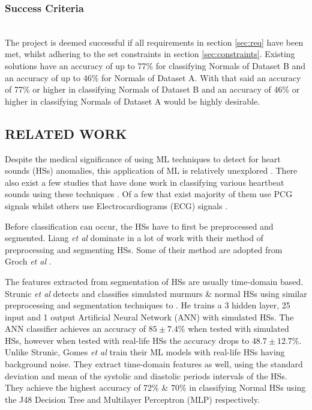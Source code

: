 \documentclass[10pt,twocolumn]{witseiepaper}
\begin{document}
\subsubsection{Success Criteria}
\textcolor{white}{O re swarele...}\\
The project is deemed successful if all requirements in section \ref{sec:req} have been met, whilst adhering to the set constraints in section \ref{sec:constraints}. Existing solutions
have an accuracy of up to 77\% for classifying Normals of Dataset B and an accuracy of up to 46\%
for Normals of Dataset A. With that said an accuracy of 77\% or higher in classifying Normals of Dataset B and
an accuracy of 46\% or higher in classifying Normals of Dataset A would be highly desirable.

\subsection{RELATED WORK}
Despite the medical significance of using ML techniques to detect for heart sounds (HSs) anomalies, this application of ML is relatively unexplored \cite{bentley}. There also exist a few studies that have done work in classifying various heartbeat sounds using these techniques \cite{26}. Of a few that exist majority of them use PCG signals \cite{53,51,36,37} whilst others use Electrocardiograms (ECG) signals \cite{4,5}. 

Before classification can occur, the HSs have to first be preprocessed and segmented. Liang \textit{et al} \cite{6} dominate in a lot of work \cite{11,19,15,50} with their method of preprocessing and segmenting HSs. Some of their method are adopted from Groch \textit{et al} \cite{2}. 

The features extracted from segmentation of HSs are usually time-domain based. Strunic \textit{et al} \cite{3} detects and classifies simulated murmurs \& normal HSs using similar preprocessing and segmentation techniques to \cite{6}. He trains a 3 hidden layer, 25 input and 1 output Artificial Neural Network (ANN) with simulated HSs. The ANN classifier achieves an accuracy of $85\pm7.4\%$ when tested with simulated HSs, however when tested with real-life HSs the accuracy drops to $48.7\pm12.7\%$. Unlike Strunic, Gomes \textit{et al} \cite{gomes2012classifying} train their ML models with real-life HSs having background noise. They extract time-domain features as well, using the standard deviation and mean of the systolic and diastolic periods intervals of the HSs. They achieve the highest accuracy of 72\% \& 70\% in classifying Normal HSs using the J48 Decision Tree and Multilayer Perceptron (MLP) respectively.
\end{document}
